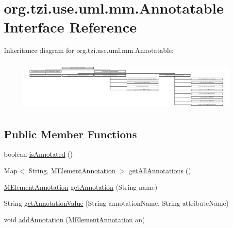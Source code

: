 \hypertarget{interfaceorg_1_1tzi_1_1use_1_1uml_1_1mm_1_1_annotatable}{\section{org.\-tzi.\-use.\-uml.\-mm.\-Annotatable Interface Reference}
\label{interfaceorg_1_1tzi_1_1use_1_1uml_1_1mm_1_1_annotatable}
}
Inheritance diagram for org.\-tzi.\-use.\-uml.\-mm.\-Annotatable\-:\begin{figure}[H]
\begin{center}
\leavevmode
\includegraphics[height=2.639246cm]{interfaceorg_1_1tzi_1_1use_1_1uml_1_1mm_1_1_annotatable}
\end{center}
\end{figure}
\subsection*{Public Member Functions}
\begin{DoxyCompactItemize}
\item 
boolean \hyperlink{interfaceorg_1_1tzi_1_1use_1_1uml_1_1mm_1_1_annotatable_a43e21576242037a5fa758f7ac4c407de}{is\-Annotated} ()
\item 
Map$<$ String, \hyperlink{classorg_1_1tzi_1_1use_1_1uml_1_1mm_1_1_m_element_annotation}{M\-Element\-Annotation} $>$ \hyperlink{interfaceorg_1_1tzi_1_1use_1_1uml_1_1mm_1_1_annotatable_ae840b759dc57fa42a22fe5e877a4dad3}{get\-All\-Annotations} ()
\item 
\hyperlink{classorg_1_1tzi_1_1use_1_1uml_1_1mm_1_1_m_element_annotation}{M\-Element\-Annotation} \hyperlink{interfaceorg_1_1tzi_1_1use_1_1uml_1_1mm_1_1_annotatable_a4e879ecdfba35ae8f60d3990b1dafc1c}{get\-Annotation} (String name)
\item 
String \hyperlink{interfaceorg_1_1tzi_1_1use_1_1uml_1_1mm_1_1_annotatable_aa2b3f01fae754a10dd08d1d7581d9d76}{get\-Annotation\-Value} (String annotation\-Name, String attribute\-Name)
\item 
void \hyperlink{interfaceorg_1_1tzi_1_1use_1_1uml_1_1mm_1_1_annotatable_aa12c075f592be18cc30cb92cac447880}{add\-Annotation} (\hyperlink{classorg_1_1tzi_1_1use_1_1uml_1_1mm_1_1_m_element_annotation}{M\-Element\-Annotation} an)
\end{DoxyCompactItemize}


